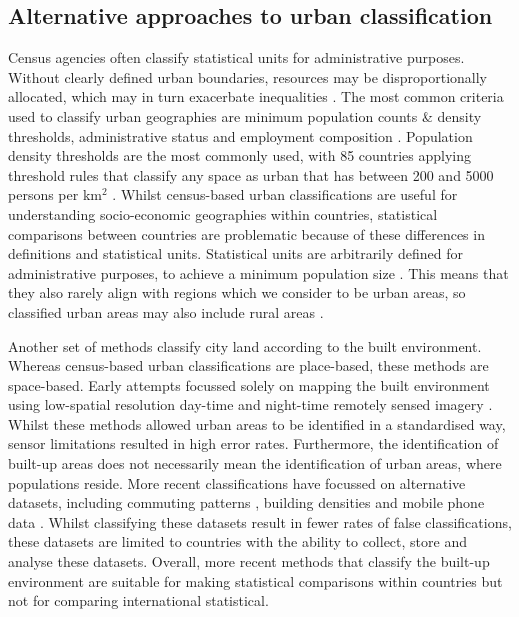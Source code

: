 \documentclass[review]{elsarticle}
\begin{document}
	
	\subsection{Alternative approaches to urban classification}
	Census agencies often classify statistical units for administrative purposes.
	Without clearly defined urban boundaries, resources may be disproportionally allocated, which may in turn exacerbate inequalities \cite{He2018}.
	The most common criteria used to classify urban geographies are minimum population counts \& density thresholds, administrative status and employment composition \cite{Satterthwaite2007, Batty2018}. 
	Population density thresholds are the most commonly used, with 85 countries applying threshold rules that classify any space as urban that has between 200 and 5000 persons per km$^2$ \cite{OECD2020}.
	Whilst census-based urban classifications are useful for understanding socio-economic geographies within countries, statistical comparisons between countries are problematic because of these differences in definitions and statistical units.
	Statistical units are arbitrarily defined for administrative purposes, to achieve a minimum population size \cite{Foxetal2017}. 
	This means that they also rarely align with regions which we consider to be urban areas, so classified urban areas may also include rural areas \cite{Buettner2015, Taubenboecketal2017}.
	
	
	Another set of methods classify city land according to the built environment.
	Whereas census-based urban classifications are place-based, these methods are space-based.
	Early attempts focussed solely on mapping the built environment using low-spatial resolution day-time \cite{Schneider2012, Arinoetal2012} and night-time remotely sensed imagery \cite{Balketal2006}.
	Whilst these methods allowed urban areas to be identified in a standardised way, sensor limitations resulted in high error rates.
	Furthermore, the identification of built-up areas does not necessarily mean the identification of urban areas, where populations reside.
	More recent classifications have focussed on alternative datasets, including commuting patterns \cite{FarmerFotheringham2011, Guéroisetal2014, ShenBatty2019}, building densities \cite{ArribasBeletal2019, Bellefonetal2019} and mobile phone data \cite{Thomasetal2012}.
	Whilst classifying these datasets result in fewer rates of false classifications, these datasets are limited to countries with the ability to collect, store and analyse these datasets.
	Overall, more recent methods that classify the built-up environment are suitable for making statistical comparisons within countries but not for comparing international statistical.
	
\end{document}
